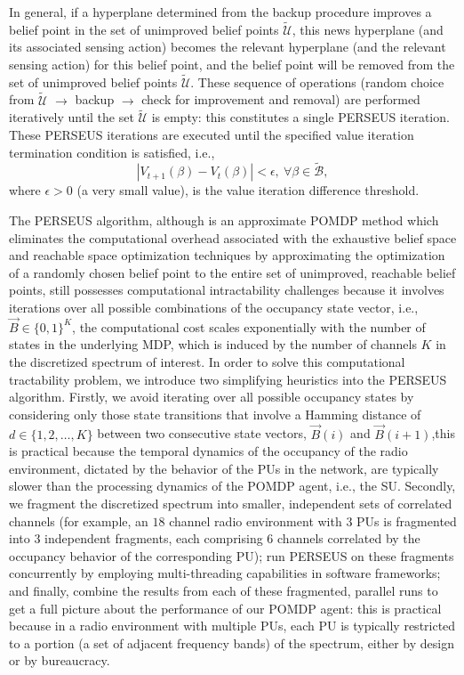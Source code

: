 \documentclass[12pt, draftcls, onecolumn]{IEEEtran}
\begin{document}
In general, if a hyperplane determined from the backup procedure improves a belief point in the set of unimproved belief points $\tilde{\mathcal{U}}$, this news hyperplane (and its associated sensing action) becomes the relevant hyperplane (and the relevant sensing action) for this belief point, and the belief point will be removed from the set of unimproved belief points $\tilde{\mathcal{U}}$. These sequence of operations (random choice from $\tilde{\mathcal{U}}$ ${\longrightarrow}$ backup ${\longrightarrow}$ check for improvement and removal) are performed iteratively until the set $\tilde{\mathcal{U}}$ is empty: this constitutes a single PERSEUS iteration. These PERSEUS iterations are executed until the specified value iteration termination condition is satisfied, i.e.,
\begin{equation}\label{29}
    |V_{t+1}(\beta)-V_{t}(\beta)|<\epsilon,\ \forall \beta \in \tilde{\mathcal{B}},
\end{equation}
where $\epsilon{>}0$ (a very small value), is the value iteration difference threshold.

The PERSEUS algorithm, although is an approximate POMDP method which eliminates the computational overhead associated with the exhaustive belief space and reachable space optimization techniques \cite{PUOccupancy:18,PUOccupancy:17} by approximating the optimization of a randomly chosen belief point to the entire set of unimproved, reachable belief points, still possesses computational intractability challenges because it involves iterations over all possible combinations of the occupancy state vector, i.e., $\vec{B}{\in}\{0,1\}^{K}$, the computational cost scales exponentially with the number of states in the underlying MDP, which is induced by the number of channels $K$ in the discretized spectrum of interest. In order to solve this computational tractability problem, we introduce two simplifying heuristics into the PERSEUS algorithm. Firstly, we avoid iterating over all possible occupancy states by considering only those state transitions that involve a Hamming distance of $d{\in}\{1,2,\dots,K\}$ between two consecutive state vectors, $\vec{B}(i)$ and $\vec{B}(i+1)$,this is practical because the temporal dynamics of the occupancy of the radio environment, dictated by the behavior of the PUs in the network, are typically slower than the processing dynamics of the POMDP agent, i.e., the SU. Secondly, we fragment the discretized spectrum into smaller, independent sets of correlated channels (for example, an $18$ channel radio environment with $3$ PUs is fragmented into $3$ independent fragments, each comprising $6$ channels correlated by the occupancy behavior of the corresponding PU); run PERSEUS on these fragments concurrently by employing multi-threading capabilities in software frameworks; and finally, combine the results from each of these fragmented, parallel runs to get a full picture about the performance of our POMDP agent: this is practical because in a radio environment with multiple PUs, each PU is typically restricted to a portion (a set of adjacent frequency bands) of the spectrum, either by design or by bureaucracy.
\end{document}

